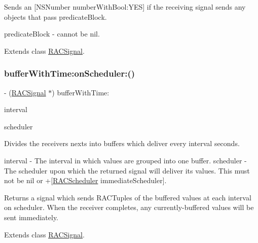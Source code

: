 Sends an \mbox{[}N\+S\+Number number\+With\+Bool\+:Y\+ES\mbox{]} if the receiving signal sends any objects that pass {\ttfamily predicate\+Block}.

predicate\+Block -\/ cannot be nil. 

Extends class \mbox{\hyperlink{interface_r_a_c_signal_a4bfb6af6556526457fbf0e5d3c878536}{R\+A\+C\+Signal}}.

\mbox{\label{category_r_a_c_signal_07_operations_08_a7f0cb2086a2123f40552d2eab2a9cc54}} 
\subsubsection{\texorpdfstring{buffer\+With\+Time\+:on\+Scheduler\+:()}{bufferWithTime:onScheduler:()}\hspace{0.1cm}{\footnotesize\ttfamily [1/3]}}
{\footnotesize\ttfamily -\/ (\mbox{\hyperlink{interface_r_a_c_signal}{R\+A\+C\+Signal}} $\ast$) buffer\+With\+Time\+: \begin{DoxyParamCaption}\item[{(N\+S\+Time\+Interval)}]{interval }\item[{onScheduler:(\mbox{\hyperlink{interface_r_a_c_scheduler}{R\+A\+C\+Scheduler}} $\ast$)}]{scheduler }\end{DoxyParamCaption}}

Divides the receiver\textquotesingle{}s {\ttfamily next}s into buffers which deliver every {\ttfamily interval} seconds.

interval -\/ The interval in which values are grouped into one buffer. scheduler -\/ The scheduler upon which the returned signal will deliver its values. This must not be nil or +\mbox{[}\mbox{\hyperlink{interface_r_a_c_scheduler}{R\+A\+C\+Scheduler}} immediate\+Scheduler\mbox{]}.

Returns a signal which sends R\+A\+C\+Tuples of the buffered values at each interval on {\ttfamily scheduler}. When the receiver completes, any currently-\/buffered values will be sent immediately. 

Extends class \mbox{\hyperlink{interface_r_a_c_signal_a7f0cb2086a2123f40552d2eab2a9cc54}{R\+A\+C\+Signal}}.

